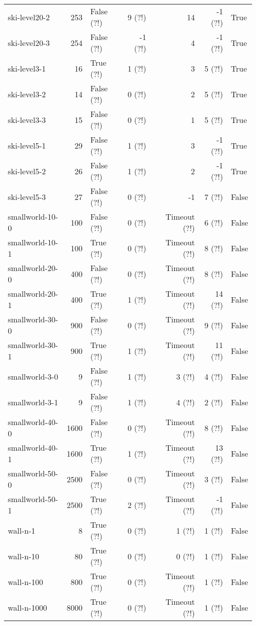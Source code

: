 \begin{longtable}{lrlrrrl}
ski-level20-2 & 253 & False (?!) & 9 (?!) & 14 & -1 (?!) & True \\
ski-level20-3 & 254 & False (?!) & -1 (?!) & 4 & -1 (?!) & True \\
ski-level3-1 & 16 & True (?!) & 1 (?!) & 3 & 5 (?!) & True \\
ski-level3-2 & 14 & False (?!) & 0 (?!) & 2 & 5 (?!) & True \\
ski-level3-3 & 15 & False (?!) & 0 (?!) & 1 & 5 (?!) & True \\
ski-level5-1 & 29 & False (?!) & 1 (?!) & 3 & -1 (?!) & True \\
ski-level5-2 & 26 & False (?!) & 1 (?!) & 2 & -1 (?!) & True \\
ski-level5-3 & 27 & False (?!) & 0 (?!) & -1 & 7 (?!) & False \\
smallworld-10-0 & 100 & False (?!) & 0 (?!) & Timeout (?!) & 6 (?!) & False \\
smallworld-10-1 & 100 & True (?!) & 0 (?!) & Timeout (?!) & 8 (?!) & False \\
smallworld-20-0 & 400 & False (?!) & 0 (?!) & Timeout (?!) & 8 (?!) & False \\
smallworld-20-1 & 400 & True (?!) & 1 (?!) & Timeout (?!) & 14 (?!) & False \\
smallworld-30-0 & 900 & False (?!) & 0 (?!) & Timeout (?!) & 9 (?!) & False \\
smallworld-30-1 & 900 & True (?!) & 1 (?!) & Timeout (?!) & 11 (?!) & False \\
smallworld-3-0 & 9 & False (?!) & 1 (?!) & 3 (?!) & 4 (?!) & False \\
smallworld-3-1 & 9 & False (?!) & 1 (?!) & 4 (?!) & 2 (?!) & False \\
smallworld-40-0 & 1600 & False (?!) & 0 (?!) & Timeout (?!) & 8 (?!) & False \\
smallworld-40-1 & 1600 & True (?!) & 1 (?!) & Timeout (?!) & 13 (?!) & False \\
smallworld-50-0 & 2500 & False (?!) & 0 (?!) & Timeout (?!) & 3 (?!) & False \\
smallworld-50-1 & 2500 & True (?!) & 2 (?!) & Timeout (?!) & -1 (?!) & False \\
wall-n-1 & 8 & True (?!) & 0 (?!) & 1 (?!) & 1 (?!) & False \\
wall-n-10 & 80 & True (?!) & 0 (?!) & 0 (?!) & 1 (?!) & False \\
wall-n-100 & 800 & True (?!) & 0 (?!) & Timeout (?!) & 1 (?!) & False \\
wall-n-1000 & 8000 & True (?!) & 0 (?!) & Timeout (?!) & 1 (?!) & False \\

\end{longtable}
